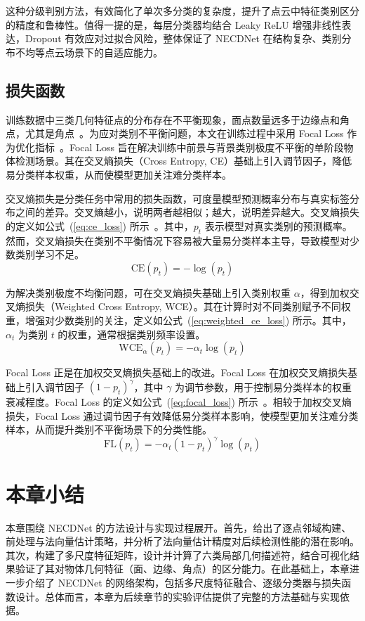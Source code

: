 这种分级判别方法，有效简化了单次多分类的复杂度，提升了点云中特征类别区分的精度和鲁棒性。值得一提的是，每层分类器均结合 Leaky ReLU 增强非线性表达，Dropout 有效应对过拟合风险，整体保证了 NECDNet 在结构复杂、类别分布不均等点云场景下的自适应能力。

\subsection{损失函数}
\label{sec:loss_function}
训练数据中三类几何特征点的分布存在不平衡现象，面点数量远多于边缘点和角点，尤其是角点~\cite{japkowicz_class_2002a}。为应对类别不平衡问题，本文在训练过程中采用 Focal Loss 作为优化指标~\cite{lin_focal_2020}。Focal Loss 旨在解决训练中前景与背景类别极度不平衡的单阶段物体检测场景。其在交叉熵损失（Cross Entropy, CE）基础上引入调节因子，降低易分类样本权重，从而使模型更加关注难分类样本。

交叉熵损失是分类任务中常用的损失函数，可度量模型预测概率分布与真实标签分布之间的差异。交叉熵越小，说明两者越相似；越大，说明差异越大。交叉熵损失的定义如公式~(\ref{eq:ce_loss}) 所示~\cite{mao_crossentropy_2023}。其中，$p_t$ 表示模型对真实类别的预测概率。然而，交叉熵损失在类别不平衡情况下容易被大量易分类样本主导，导致模型对少数类别学习不足。
\begin{equation}
    \mathrm{CE}(p_t) = -\log(p_t)
    \label{eq:ce_loss}
\end{equation}

为解决类别极度不均衡问题，可在交叉熵损失基础上引入类别权重 $\alpha$，得到加权交叉熵损失（Weighted Cross Entropy, WCE）。其在计算时对不同类别赋予不同权重，增强对少数类别的关注，定义如公式~(\ref{eq:weighted_ce_loss}) 所示。其中，$\alpha_t$ 为类别 $t$ 的权重，通常根据类别频率设置。
\begin{equation}
    \mathrm{WCE}_{\alpha}(p_t) = -\alpha_t \log(p_t)
    \label{eq:weighted_ce_loss}
\end{equation}

Focal Loss 正是在加权交叉熵损失基础上的改进。Focal Loss 在加权交叉熵损失基础上引入调节因子 $(1 - p_t)^\gamma$，其中 $\gamma$ 为调节参数，用于控制易分类样本的权重衰减程度。Focal Loss 的定义如公式~(\ref{eq:focal_loss}) 所示~\cite{lin_focal_2020}。相较于加权交叉熵损失，Focal Loss 通过调节因子有效降低易分类样本影响，使模型更加关注难分类样本，从而提升类别不平衡场景下的分类性能。
\begin{equation}
    \mathrm{FL}(p_t) = -\alpha_t (1 - p_t)^\gamma \log(p_t)
    \label{eq:focal_loss}
\end{equation}


\section{本章小结}
本章围绕 NECDNet 的方法设计与实现过程展开。首先，给出了逐点邻域构建、前处理与法向量估计策略，并分析了法向量估计精度对后续检测性能的潜在影响。其次，构建了多尺度特征矩阵，设计并计算了六类局部几何描述符，结合可视化结果验证了其对物体几何特征（面、边缘、角点）的区分能力。在此基础上，本章进一步介绍了 NECDNet 的网络架构，包括多尺度特征融合、逐级分类器与损失函数设计。总体而言，本章为后续章节的实验评估提供了完整的方法基础与实现依据。

